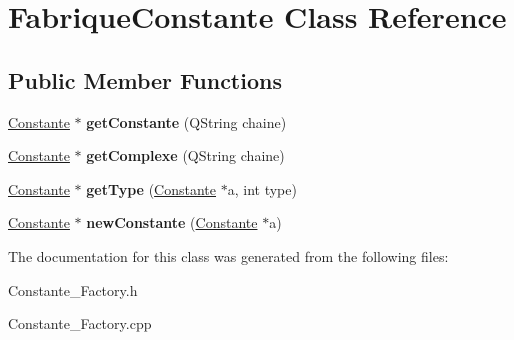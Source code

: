 \hypertarget{class_fabrique_constante}{\section{Fabrique\-Constante Class Reference}
\label{class_fabrique_constante}
}
\subsection*{Public Member Functions}
\begin{DoxyCompactItemize}
\item 
\hypertarget{class_fabrique_constante_a7d192cf62b0c19f17d0ebdb8dac371ab}{\hyperlink{class_calcul_1_1_constante}{Constante} $\ast$ {\bfseries get\-Constante} (Q\-String chaine)}\label{class_fabrique_constante_a7d192cf62b0c19f17d0ebdb8dac371ab}

\item 
\hypertarget{class_fabrique_constante_a05259a5b19903d8f1b640e45621d1fd4}{\hyperlink{class_calcul_1_1_constante}{Constante} $\ast$ {\bfseries get\-Complexe} (Q\-String chaine)}\label{class_fabrique_constante_a05259a5b19903d8f1b640e45621d1fd4}

\item 
\hypertarget{class_fabrique_constante_a432cc65aa3d80402ea017963d5c06edf}{\hyperlink{class_calcul_1_1_constante}{Constante} $\ast$ {\bfseries get\-Type} (\hyperlink{class_calcul_1_1_constante}{Constante} $\ast$a, int type)}\label{class_fabrique_constante_a432cc65aa3d80402ea017963d5c06edf}

\item 
\hypertarget{class_fabrique_constante_aa1f4a720e896aaeabd85b0dc042c2ecf}{\hyperlink{class_calcul_1_1_constante}{Constante} $\ast$ {\bfseries new\-Constante} (\hyperlink{class_calcul_1_1_constante}{Constante} $\ast$a)}\label{class_fabrique_constante_aa1f4a720e896aaeabd85b0dc042c2ecf}

\end{DoxyCompactItemize}


The documentation for this class was generated from the following files\-:\begin{DoxyCompactItemize}
\item 
Constante\-\_\-\-Factory.\-h\item 
Constante\-\_\-\-Factory.\-cpp\end{DoxyCompactItemize}

